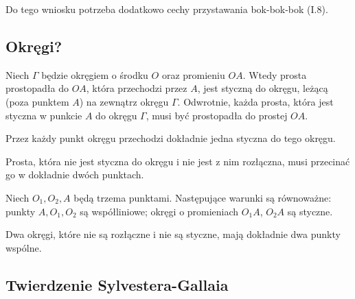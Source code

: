 Do tego wniosku potrzeba dodatkowo cechy przystawania bok-bok-bok (I.8).

\subsection{Okręgi?}

\begin{proposition}
    Niech $\Gamma$ będzie okręgiem o środku $O$ oraz promieniu $OA$.
    Wtedy prosta prostopadła do $OA$, która przechodzi przez $A$, jest styczną do okręgu, leżącą (poza punktem $A$) na zewnątrz okręgu $\Gamma$.
    Odwrotnie, każda prosta, która jest styczna w punkcie $A$ do okręgu $\Gamma$, musi być prostopadła do prostej $OA$.
\end{proposition} %

\begin{corollary}
    Przez każdy punkt okręgu przechodzi dokładnie jedna styczna do tego okręgu.
\end{corollary} %

\begin{corollary}
    Prosta, która nie jest styczna do okręgu i nie jest z nim rozłączna, musi przecinać go w dokładnie dwóch punktach.
\end{corollary} %

\begin{proposition}
    Niech $O_1, O_2, A$ będą trzema punktami.
    Następujące warunki są równoważne: punkty $A, O_1, O_2$ są współliniowe; okręgi o promieniach $O_1A$, $O_2A$ są styczne.
\end{proposition} %

\begin{corollary}
    Dwa okręgi, które nie są rozłączne i nie są styczne, mają dokładnie dwa punkty wspólne.
\end{corollary} %

\subsection{Twierdzenie Sylvestera-Gallaia}
